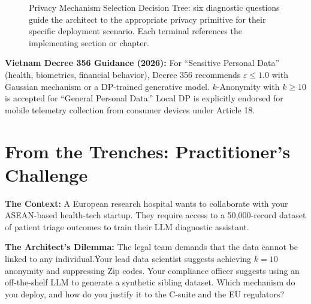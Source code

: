 \begin{figure}[ht]
\caption{Privacy Mechanism Selection Decision Tree: six diagnostic questions guide the architect to the appropriate privacy primitive for their specific deployment scenario. Each terminal references the implementing section or chapter.}
\label{fig:privacy_selection_tree}
\end{figure}

\begin{svgraybox}
\textbf{Vietnam Decree 356 Guidance (2026):} For ``Sensitive Personal Data'' (health, biometrics, financial behavior), Decree 356 recommends $\varepsilon \leq 1.0$ with Gaussian mechanism or a DP-trained generative model. $k$-Anonymity with $k \geq 10$ is accepted for ``General Personal Data.'' Local DP is explicitly endorsed for mobile telemetry collection from consumer devices under Article 18.
\end{svgraybox}

\section{From the Trenches: Practitioner's Challenge}
\label{sec:ch4_challenge}

\begin{tcolorbox}[challengebox, title={Scenario: The Cross-Border Health Audit}]
\textbf{The Context:} 
A European research hospital wants to collaborate with your ASEAN-based health-tech startup. They require access to a 50,000-record dataset of patient triage outcomes to train their LLM diagnostic assistant. 

\textbf{The Architect's Dilemma:} 
The legal team demands that the data \"cannot be linked to any individual.\" Your lead data scientist suggests achieving $k=10$ anonymity and suppressing Zip codes. Your compliance officer suggests using an off-the-shelf LLM to generate a synthetic sibling dataset. Which mechanism do you deploy, and how do you justify it to the C-suite and the EU regulators?
\end{tcolorbox}


